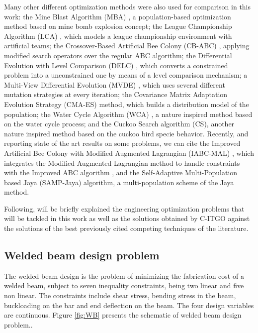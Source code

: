 Many other different optimization methods were also used for comparison in this work: the Mine Blast Algorithm (MBA) \citep{MBA}, a population-based optimization method based on mine bomb explosion concept; the League Championship Algorithm (LCA) \citep{LCA}, which models a league championship environment with artificial teams; the Crossover-Based Artificial Bee Colony (CB-ABC) \citep{CB-ABC}, applying modified search operators over the regular ABC algorithm; the Differential Evolution with Level Comparison (DELC) \citep{DELC}, which converts a constrained problem into a unconstrained one by means of a level comparison mechanism; a Multi-View Differential Evolution (MVDE) \citep{MVDE}, which uses several different mutation strategies at every iteration; the Covariance Matrix Adaptation Evolution Strategy (CMA-ES) \citep{CMA-ES} method, which builds a distribution model of the population; the Water Cycle Algorithm (WCA) \citep{WCA}, a nature inspired method based on the water cycle process; and the Cuckoo Search algorithm (CS), another nature inspired method based on the cuckoo bird specie behavior. Recently, and reporting state of the art results on some problems, we can cite the Improved Artificial Bee Colony with Modified Augmented Lagrangian (IABC-MAL) \citep{IABC-Mal}, which integrates the Modified Augmented Lagrangian method to handle constraints with the Improved ABC algorithm \citep{IABC}, and the Self-Adaptive Multi-Population based Jaya (SAMP-Jaya) \citep{SAMP-Jaya} algorithm, a multi-population scheme of the Jaya \citep{Jaya} method.


Following, will be briefly explained the engineering optimization problems that will be tackled in this work as well as the solutions obtained by C-ITGO against the solutions of the best previously cited competing techniques of the literature.



\subsection{Welded beam design problem}

The welded beam design \citep{WB} is the problem of minimizing the fabrication cost of a welded beam, subject to seven inequality constraints, being two linear and five non linear. The constraints include shear stress, bending stress in the beam, buckloading on the bar and end deflection on the beam. The four design variables are continuous. Figure \ref{fig:WB} presents the schematic of welded beam design problem..

